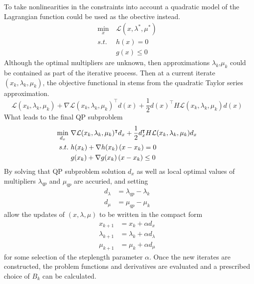 To take nonlinearities in the constraints into account a quadratic model of the Lagrangian function could be used as the obective instead.
\begin{subequations}
	\begin{align}
	\min_{x}\  & \mathcal{L}(x,\lambda^*,\mu^*)\\
	s.t.\  &h(x)= 0\\
	&g(x)\leq 0
	\end{align}
\end{subequations}
Although the optimal multipliers are unknown, then approximations $\lambda_k$,$\mu_k$ could be contained as part of the iterative process. Then at a current iterate $(x_k,\lambda_k,\mu_k)$, the objective functional in stems from the quadratic Taylor series approximation.
\begin{equation}
	\mathcal{L}(x_k,\lambda_k,\mu_k)+\nabla\mathcal{L}(x_k,\lambda_k,\mu_k)^\intercal d(x)+\frac{1}{2}d(x)^\intercal H\mathcal{L}(x_k,\lambda_k,\mu_k) d(x)
\end{equation}
What leads to the final QP subproblem
\begin{subequations}
	\begin{align}
	\min_{d_x}\  &\nabla \mathcal{L}(x_k,\lambda_k,\mu_k)^\intercal d_x+\frac{1}{2}d_x^\intercal H\mathcal{L}(x_k,\lambda_k,\mu_k)d_x\\
	s.t.\  &h(x_k)+\nabla h(x_k)\left( x-x_k \right) = 0\\
	&g(x_k)+\nabla g(x_k)\left( x-x_k \right)\leq 0
	\end{align}
\end{subequations}
By solving that QP subproblem solution $d_x$ as well as local optimal values of multipliers $\lambda_{qp}$ and $\mu_{qp}$ are accuried, and setting 
\begin{subequations}
	\begin{align}
		d_\lambda &= \lambda_{qp}-\lambda_k\\
		d_\mu &= \mu_{qp}-\mu_k
	\end{align}
\end{subequations}
allow the updates of $(x,\lambda,\mu)$ to be written in the compact form
\begin{subequations}
	\begin{align}
	x_{k+1} &= x_k + \alpha d_x\\
	\lambda_{k+1} &= \lambda_k + \alpha d_\lambda\\
	\mu_{k+1} &= \mu_k + \alpha d_\mu
	\end{align}
\end{subequations}
for some selection of the steplength parameter $\alpha$. Once the new iterates are constructed, the problem functions and derivatives are evaluated and a
prescribed choice of $B_k$ can be calculated.

